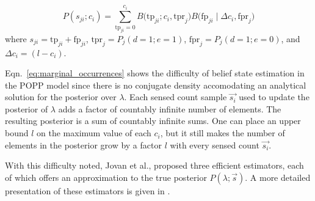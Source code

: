 \begin{equation}
	\label{eq:joint_binomial_distribution}
    P(s_{ji} ; c_i) \! = \! \! \! \displaystyle\sum_{\textrm{tp}_{ji} = 0}^{c_{i}} \! \! B\Big(\textrm{tp}_{ji} ; c_i, \textrm{tpr}_j\Big) B\Big(\textrm{fp}_{ji} \mid \Delta c_i, \textrm{fpr}_j \Big)
\end{equation}
\noindent where $s_{ji} = \textrm{tp}_{ji} + \textrm{fp}_{ji}$, $\textrm{tpr}_j = P_j(d=1 ; e=1)$, $\textrm{fpr}_j = P_j(d=1 ; e=0)$, and $\Delta c_i = (l - c_i)$.

Eqn.~\ref{eq:marginal_occurrences} shows the difficulty of belief state estimation in the POPP model since there is no conjugate density accomodating an analytical solution for the posterior over $\lambda$. Each sensed count sample $\overrightarrow{s_i}$ used to update the posterior of $\lambda$ adds a factor of countably infinite number of elements. The resulting posterior is a sum of countably infinite sums. One can place an upper bound $l$ on the maximum value of each $c_i$, but it still makes the number of elements in the posterior grow by a factor $l$ with every sensed count $\overrightarrow{s_i}$.  

With this difficulty noted, Jovan et al., proposed three efficient estimators, each of which offers an approximation to the true posterior $P(\lambda ; \overrightarrow{s})$. A more detailed presentation of these estimators is given in \cite{jovan18a}.
